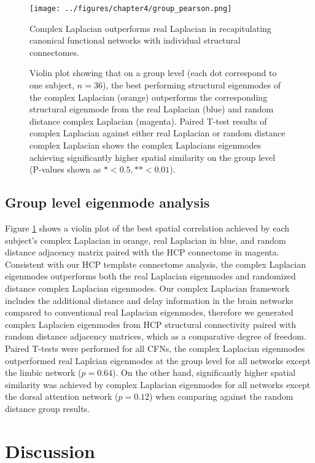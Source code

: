 \begin{figure}[ht]
\centering
\texttt{[image: ../figures/chapter4/group\_pearson.png]}
\caption{Complex Laplacian outperforms real Laplacian in recapitulating canonical functional networks with individual structural connectomes.}
\caption*{Violin plot showing that on a group level (each dot correspond to one subject, $n = 36$), the best performing structural eigenmodes of the complex Laplacian (orange) outperforms the corresponding structural eigenmode from the real Laplacian (blue) and random distance complex Laplacian (magenta). Paired T-test results of complex Laplacian against either real Laplacian or random distance complex Laplacian shows the complex Laplacians eigenmodes achieving significantly higher spatial similarity on the group level (P-values shown as $* < 0.5, ** < 0.01$).}
\label{fig:fig7}
\end{figure}

\subsection{Group level eigenmode analysis}
Figure \ref{fig:fig7} shows a violin plot of the best spatial correlation achieved by each subject's complex Laplacian in orange, real Laplacian in blue, and random distance adjacency matrix paired with the HCP connectome in magenta. Consistent  with our HCP template connectome analysis, the complex Laplacian eigenmodes outperforms both the real Laplacian eigenmodes and randomized distance complex Laplacian eigenmodes. Our complex Laplacian framework includes the additional distance and delay information in the brain networks compared to conventional real Laplacian eigenmodes, therefore we generated complex Laplacien eigenmodes from HCP structural connectivity paired with random distance adjacency matrices, which as a comparative degree of freedom. Paired T-tests were performed for all CFNs, the complex Laplacian eigenmodes outperformed real Laplcian eigenmodes at the group level for all networks except the limbic network ($p=0.64$). On the other hand, significantly higher spatial similarity was achieved by complex Laplacian eigenmodes for all networks except the dorsal attention network ($p=0.12$) when comparing against the random distance group results.

\section{Discussion}

